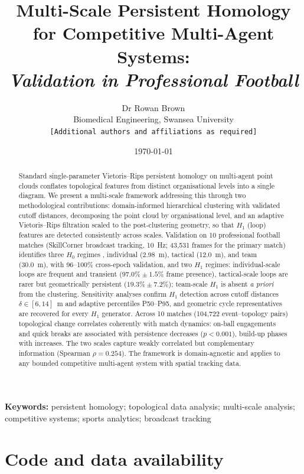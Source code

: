 \documentclass[11pt,a4paper]{article}
\title{Multi-Scale Persistent Homology for Competitive Multi-Agent Systems:\\
\textit{Validation in Professional Football}}
\author{%
  Dr Rowan Brown\\
  Biomedical Engineering, Swansea University\\
  \texttt{[Additional authors and affiliations as required]}
}
\date{\today}
\begin{document}
\maketitle

\begin{abstract}
\noindent
Standard single-parameter Vietoris--Rips persistent homology on multi-agent point clouds conflates topological features from distinct organisational levels into a single diagram. We present a multi-scale framework addressing this through two methodological contributions: domain-informed hierarchical clustering with validated cutoff distances, decomposing the point cloud by organisational level, and an adaptive Vietoris--Rips filtration scaled to the post-clustering geometry, so that $H_1$ (loop) features are detected consistently across scales. Validation on 10 professional football matches (SkillCorner broadcast tracking, 10~Hz; 43{,}531 frames for the primary match) identifies three $H_0$ regimes , individual (2.98~m), tactical (12.0~m), and team (30.0~m), with 96--100\% cross-epoch validation, and two $H_1$ regimes: individual-scale loops are frequent and transient ($97.0\% \pm 1.5\%$ frame presence), tactical-scale loops are rarer but geometrically persistent ($19.3\% \pm 7.2\%$); team-scale $H_1$ is absent \emph{a priori} from the clustering. Sensitivity analyses confirm $H_1$ detection across cutoff distances $\delta \in [6,14]$~m and adaptive percentiles P50--P95, and geometric cycle representatives are recovered for every $H_1$ generator. Across 10 matches (104{,}722 event--topology pairs) topological change correlates coherently with match dynamics: on-ball engagements and quick breaks are associated with persistence decreases ($p < 0.001$), build-up phases with increases. The two scales capture weakly correlated but complementary information (Spearman $\rho = 0.254$). The framework is domain-agnostic and applies to any bounded competitive multi-agent system with spatial tracking data.
\end{abstract}

\medskip
\noindent\textbf{Keywords:} persistent homology; topological data analysis; multi-scale analysis; competitive systems; sports analytics; broadcast tracking







\section*{Code and data availability}
\end{document}
